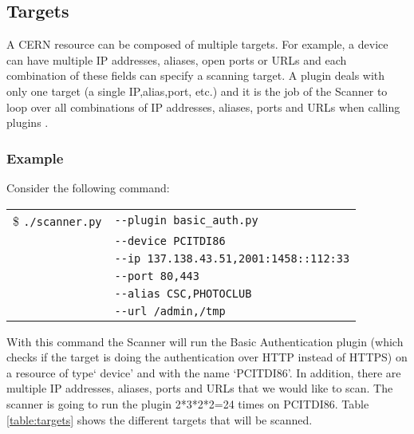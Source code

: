 \subsection{Targets}
A CERN resource can be composed of multiple targets. For example, a device can have multiple IP addresses, aliases, open ports or URLs and each combination of these fields can specify a scanning target. A plugin deals with only one target (a single IP,alias,port, etc.) and it is the job of the Scanner to loop over all combinations of IP addresses, aliases, ports and URLs when calling plugins .
\subsubsection{Example}
Consider the following command:

\begin{table}[H]
\begin{center}
    \begin{tabular}{ c  l }


\$ \texttt{./scanner.py} &  \texttt{-{}-plugin basic\_auth.py}  \\
			   &  \texttt{-{}-device PCITDI86}  \\
			   &  \texttt{-{}-ip 137.138.43.51,2001:1458::112:33} \\
	           &  \texttt{-{}-port 80,443  }\\
	           &   \texttt{-{}-alias CSC,PHOTOCLUB}  \\
    	       &  \texttt{-{}-url /admin,/tmp}
    	       
	\end{tabular}
    
   \end{center}
\end{table}
\noindent
With this command the Scanner will run the Basic Authentication plugin (which checks if the target is doing the authentication over HTTP instead of HTTPS) on a resource of type` device' and with the name `PCITDI86'. In addition, there are multiple IP addresses, aliases, ports and URLs that we would like to scan. The scanner is going to run the plugin 2*3*2*2=24 times on PCITDI86. Table \ref{table:targets} shows the different targets that will be scanned. 

